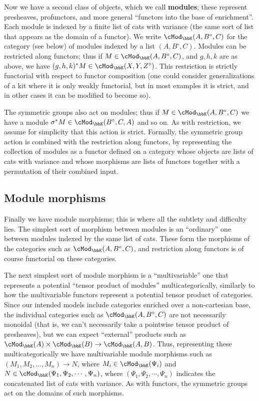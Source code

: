 \documentclass{amsart}
\newcommand{\K}{\bbK}
\let\mod\cMod
\def\modk{\mod_\K}
\renewcommand{\o}{^{\circ}}
\begin{document}
Now we have a second class of objects, which we call \textbf{modules}; these represent presheaves, profunctors, and more general ``functors into the base of enrichment''.
Each module is indexed by a finite list of cats with variance (the same sort of list that appears as the domain of a functor).
We write $\modk(A,B\o,C)$ for the category (see below) of modules indexed by a list $(A,B\o,C)$.
Modules can be restricted along functors; thus if $M\in \modk(A,B\o,C)$, and $g,h,k$ are as above, we have $(g,h,k)^*M \in \modk(X,Y,Z\o)$.
This restriction is strictly functorial with respect to functor composition (one could consider generalizations of a kit where it is only weakly functorial, but in most examples it is strict, and in other cases it can be modified to become so).

The symmetric groups also act on modules; thus if $M\in \modk(A,B\o,C)$ we have a module $\sigma^*M\in \modk(B\o,C,A)$ and so on.
As with restriction, we assume for simplicity that this action is strict.
Formally, the symmetric group action is combined with the restriction along functors, by representing the collection of modules as a functor defined on a category whose objects are lists of cats with variance and whose morphisms are lists of functors together with a permutation of their combined input.

\subsection{Module morphisms}

Finally we have module morphisms; this is where all the subtlety and difficulty lies.
The simplest sort of morphism between modules is an ``ordinary'' one between modules indexed by the same list of cats.
These form the morphisms of the categories such as $\modk(A,B\o,C)$, and restriction along functors is of course functorial on these categories.

The next simplest sort of module morphism is a ``multivariable'' one that represents a potential ``tensor product of modules'' multicategorically, similarly to how the multivariable functors represent a potential tensor product of categories.
Since our intended models include categories enriched over a non-cartesian base, the individual categories such as $\modk(A,B\o,C)$ are not necessarily monoidal (that is, we can't necessarily take a pointwise tensor product of presheaves), but we can expect ``external'' products such as $\modk(A) \times \modk(B) \to \modk(A,B)$.
Thus, representing these multicategorically we have multivariable module morphisms such as $(M_1,M_2,\dots,M_n) \to N$, where $M_i\in \modk(\Psi_i)$ and $N\in\modk(\Psi_1,\Psi_2,\cdots,\Psi_n)$, where $(\Psi_1,\Psi_2,\cdots,\Psi_n)$ indicates the concatenated list of cats with variance.
As with functors, the symmetric groups act on the domains of such morphisms.
\end{document}
